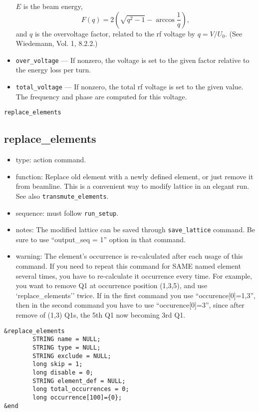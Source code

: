 \documentclass[11pt]{article}
\begin{document}
\begin{itemize}
$E$ is the beam energy, 
\begin{equation}
F(q) = 2 \left(\sqrt{q^2-1} - \arccos \frac{1}{q}\right),
\end{equation}
and $q$ is the overvoltage factor, related to the rf voltage by $q = V/U_0$. (See Wiedemann, Vol. 1, 8.2.2.)
\item \verb|over_voltage| --- If nonzero, the voltage is set to the given factor relative to the 
energy loss per turn.
\item \verb|total_voltage| --- If nonzero, the total rf voltage is set to the given value. The frequency and
  phase are computed for this voltage.
\end{itemize}

\newpage
\begin{center}{\Large\verb|replace_elements|}\end{center}
\subsection{replace\_elements \label{subsec:replaceelements}}

\begin{itemize}
\item type: action command.
\item function: Replace old element with a newly defined element, or just 
   remove it from beamline. This is a convenient way to modify lattice in an elegant run.
   See also \verb|transmute_elements|.
\item sequence: must follow \verb|run_setup|.
\item notes: 
	The modified lattice can be saved through \verb|save_lattice|
   command. Be sure to use ``output\_seq = 1'' option in that command.  
\item warning:
   The element's occurrence is re-calculated after each usage of this command. If 
   you need to repeat this command for SAME named element several times, you have to re-calculate 
   it occurrence every time. For example, you want to remove Q1 at occurrence position 
   (1,3,5), and use 
   `replace\_elements'' twice. If in the first command you use ``occurence[0]=1,3'',
   then in the second command you have to use ``occurence[0]=3'', since after remove of
   (1,3) Q1s, the 5th Q1 now becoming 3rd Q1.
\end{itemize}

\begin{verbatim}
&replace_elements
        STRING name = NULL;
        STRING type = NULL;
        STRING exclude = NULL;
        long skip = 1;
        long disable = 0;
        STRING element_def = NULL;
        long total_occurrences = 0;
        long occurrence[100]={0};
&end
\end{verbatim}
\end{document}
